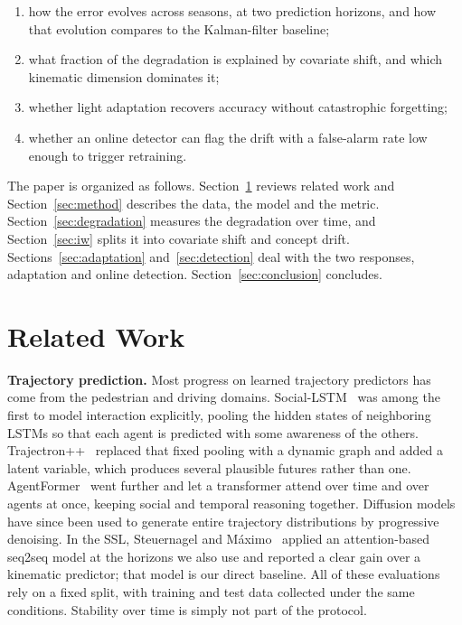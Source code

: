 \documentclass[conference]{IEEEtran}
\begin{document}
\begin{enumerate}
  \item how the error evolves across seasons, at two prediction horizons, and
        how that evolution compares to the Kalman-filter baseline;
  \item what fraction of the degradation is explained by covariate shift, and
        which kinematic dimension dominates it;
  \item whether light adaptation recovers accuracy without catastrophic
        forgetting;
  \item whether an online detector can flag the drift with a false-alarm rate
        low enough to trigger retraining.
\end{enumerate}

The paper is organized as follows. Section~\ref{sec:related} reviews related
work and Section~\ref{sec:method} describes the data, the model and the metric.
Section~\ref{sec:degradation} measures the degradation over time, and
Section~\ref{sec:iw} splits it into covariate shift and concept drift.
Sections~\ref{sec:adaptation} and~\ref{sec:detection} deal with the two
responses, adaptation and online detection. Section~\ref{sec:conclusion}
concludes.

\section{Related Work}
\label{sec:related}

\textbf{Trajectory prediction.}
Most progress on learned trajectory predictors has come from the pedestrian and
driving domains. Social-LSTM~\cite{alahi2016} was among the first to model
interaction explicitly, pooling the hidden states of neighboring LSTMs so that
each agent is predicted with some awareness of the others.
Trajectron++~\cite{salzmann2020} replaced that fixed pooling with a dynamic
graph and added a latent variable, which produces several plausible futures
rather than one. AgentFormer~\cite{yuan2021} went further and let a transformer
attend over time and over agents at once, keeping social and temporal reasoning
together. Diffusion models~\cite{gu2022} have since been used to generate entire
trajectory distributions by progressive denoising. In the SSL, Steuernagel and
M\'aximo~\cite{seq2seq} applied an attention-based seq2seq model at the horizons
we also use and reported a clear gain over a kinematic predictor; that model is
our direct baseline. All of these evaluations rely on a fixed split, with
training and test data collected under the same conditions. Stability over time
is simply not part of the protocol.
\end{document}
